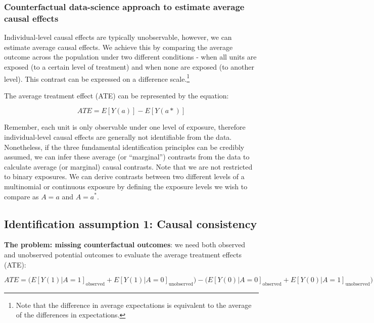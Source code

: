 \documentclass[
  singlecolumn]{report}
\begin{document}
\hypertarget{counterfactual-data-science-approach-to-estimate-average-causal-effects}{%
\subsubsection{Counterfactual data-science approach to estimate average
causal
effects}\label{counterfactual-data-science-approach-to-estimate-average-causal-effects}}

Individual-level causal effects are typically unobservable, however, we
can estimate average causal effects. We achieve this by comparing the
average outcome across the population under two different conditions -
when all units are exposed (to a certain level of treatment) and when
none are exposed (to another level). This contrast can be expressed on a
difference scale.\footnote{Note that the difference in average
  expectations is equivalent to the average of the differences in
  expectations.}

The average treatment effect (ATE) can be represented by the equation:

\[
ATE = E[Y(a)] - E[Y(a*)]
\]

Remember, each unit is only observable under one level of exposure,
therefore individual-level causal effects are generally not identifiable
from the data. Nonetheless, if the three fundamental identification
principles can be credibly assumed, we can infer these average (or
``marginal'') contrasts from the data to calculate average (or marginal)
causal contrasts. Note that we are not restricted to binary exposures.
We can derive contrasts between two different levels of a multinomial or
continuous exposure by defining the exposure levels we wish to compare
as \(A = a\) and \(A = a^*\).

\hypertarget{identification-assumption-1-causal-consistency}{%
\subsection{Identification assumption 1: Causal
consistency}\label{identification-assumption-1-causal-consistency}}

\textbf{The problem: missing counterfactual outcomes}: we need both
observed and unobserved potential outcomes to evaluate the average
treatment effects (ATE):

\[
ATE = \bigg(E[Y(1)|A = 1]_{\text{observed}} + E[Y(1)|A = 0]_{\text{unobserved}}\bigg) - \bigg(E[Y(0)|A = 0]_{\text{observed}}  + E[Y(0)|A = 1]_{\text{unobserved}}\bigg)
\]
\end{document}
